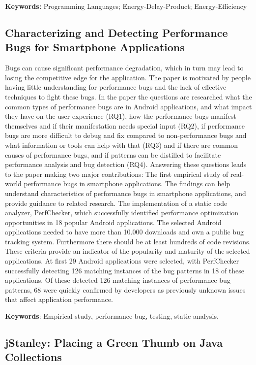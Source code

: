 \documentclass[]{book}
\begin{document}
\textbf{Keywords:} Programming Languages; Energy-Delay-Product;
Energy-Efficiency

\subsection{Characterizing and Detecting Performance Bugs for Smartphone
Applications}\label{characterizing-and-detecting-performance-bugs-for-smartphone-applications}

Bugs can cause significant performance degradation, which in turn may
lead to losing the competitive edge for the application. The paper is
motivated by people having little understanding for performance bugs and
the lack of effective techniques to fight these bugs. In the paper the
questions are researched what the common types of performance bugs are
in Android applications, and what impact they have on the user
experience (RQ1), how the performance bugs manifest themselves and if
their manifestation needs special input (RQ2), if performance bugs are
more difficult to debug and fix compared to non-performance bugs and
what information or tools can help with that (RQ3) and if there are
common causes of performance bugs, and if patterns can be distilled to
facilitate performance analysis and bug detection (RQ4). Answering these
questions leads to the paper making two major contributions: The first
empirical study of real-world performance bugs in smartphone
applications. The findings can help understand characteristics of
performance bugs in smartphone applications, and provide guidance to
related research. The implementation of a static code analyzer,
PerfChecker, which successfully identified performance optimization
opportunities in 18 popular Android applications. The selected Android
applications needed to have more than 10.000 downloads and own a public
bug tracking system. Furthermore there should be at least hundreds of
code revisions. These criteria provide an indicator of the popularity
and maturity of the selected applications. At first 29 Android
applications were selected, with PerfChecker successfully detecting 126
matching instances of the bug patterns in 18 of these applications. Of
these detected 126 matching instances of performance bug patterns, 68
were quickly confirmed by developers as previously unknown issues that
affect application performance.

\textbf{Keywords}: Empirical study, performance bug, testing, static
analysis.

\subsection{jStanley: Placing a Green Thumb on Java
Collections}\label{jstanley-placing-a-green-thumb-on-java-collections}
\end{document}
